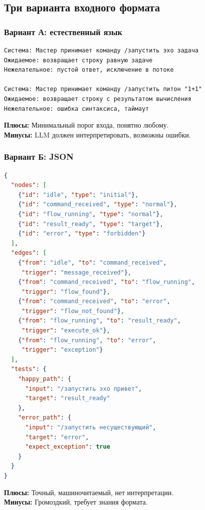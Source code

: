 \documentclass[12pt, a4paper, twoside]{article}
\begin{document}
\subsection{Три варианта входного формата}

\subsubsection{Вариант А: естественный язык}

\begin{lstlisting}[language={},caption={Описание на естественном языке}]
Система: Мастер принимает команду /запустить эхо задача
Ожидаемое: возвращает строку равную задаче
Нежелательное: пустой ответ, исключение в потоке

Система: Мастер принимает команду /запустить питон "1+1"
Ожидаемое: возвращает строку с результатом вычисления
Нежелательное: ошибка синтаксиса, таймаут
\end{lstlisting}

\textbf{Плюсы:} Минимальный порог входа, понятно любому.\\
\textbf{Минусы:} LLM должен интерпретировать, возможны ошибки.

\subsubsection{Вариант Б: JSON}

\begin{lstlisting}[language=JSON,caption={Граф в формате JSON}]
{
  "nodes": [
    {"id": "idle", "type": "initial"},
    {"id": "command_received", "type": "normal"},
    {"id": "flow_running", "type": "normal"},
    {"id": "result_ready", "type": "target"},
    {"id": "error", "type": "forbidden"}
  ],
  "edges": [
    {"from": "idle", "to": "command_received",
     "trigger": "message_received"},
    {"from": "command_received", "to": "flow_running",
     "trigger": "flow_found"},
    {"from": "command_received", "to": "error",
     "trigger": "flow_not_found"},
    {"from": "flow_running", "to": "result_ready",
     "trigger": "execute_ok"},
    {"from": "flow_running", "to": "error",
     "trigger": "exception"}
  ],
  "tests": {
    "happy_path": {
      "input": "/запустить эхо привет",
      "target": "result_ready"
    },
    "error_path": {
      "input": "/запустить несуществующий",
      "target": "error",
      "expect_exception": true
    }
  }
}
\end{lstlisting}

\textbf{Плюсы:} Точный, машиночитаемый, нет интерпретации.\\
\textbf{Минусы:} Громоздкий, требует знания формата.
\end{document}
